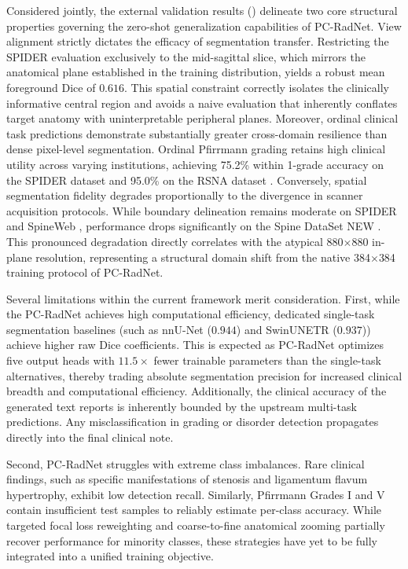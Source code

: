 \documentclass[journal]{IEEEtran}
\newcommand{\modelname}{PC-RadNet}
\begin{document}
Considered jointly, the external validation results () delineate two core structural properties governing the zero-shot generalization capabilities of \modelname{}. View alignment strictly dictates the efficacy of segmentation transfer. Restricting the SPIDER \cite{van2024spider} evaluation exclusively to the mid-sagittal slice, which mirrors the anatomical plane established in the training distribution, yields a robust mean foreground Dice of $0.616$. This spatial constraint correctly isolates the clinically informative central region and avoids a naive evaluation that inherently conflates target anatomy with uninterpretable peripheral planes. Moreover, ordinal clinical task predictions demonstrate substantially greater cross-domain resilience than dense pixel-level segmentation. Ordinal Pfirrmann grading retains high clinical utility across varying institutions, achieving 75.2\% within 1-grade accuracy on the SPIDER dataset and 95.0\% on the RSNA dataset \cite{rsna_lumbar_2026}. Conversely, spatial segmentation fidelity degrades proportionally to the divergence in scanner acquisition protocols. While boundary delineation remains moderate on SPIDER and SpineWeb \cite{spineweb2012}, performance drops significantly on the Spine DataSet NEW \cite{spineparsenet2021}. This pronounced degradation directly correlates with the atypical 880$\times$880 in-plane resolution, representing a structural domain shift from the native 384$\times$384 training protocol of \modelname{}.


Several limitations within the current framework merit consideration. First, while the \modelname{} achieves high computational efficiency, dedicated single-task segmentation baselines (such as nnU-Net ($0.944$) and SwinUNETR ($0.937$)) achieve higher raw Dice coefficients. This is expected as \modelname{} optimizes five output heads with $11.5{\times}$ fewer trainable parameters than the single-task alternatives, thereby trading absolute segmentation precision for increased clinical breadth and computational efficiency. Additionally, the clinical accuracy of the generated text reports is inherently bounded by the upstream multi-task predictions. Any misclassification in grading or disorder detection propagates directly into the final clinical note. 

Second, \modelname{} struggles with extreme class imbalances. Rare clinical findings, such as specific manifestations of stenosis and ligamentum flavum hypertrophy, exhibit low detection recall. Similarly, Pfirrmann Grades I and V contain insufficient test samples to reliably estimate per-class accuracy. While targeted focal loss reweighting and coarse-to-fine anatomical zooming partially recover performance for minority classes, these strategies have yet to be fully integrated into a unified training objective. 
\end{document}
